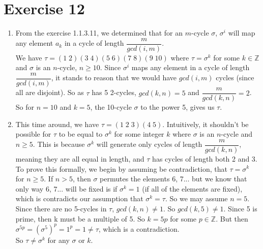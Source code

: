 \documentclass{article}
\newcommand{\Z}{\mathbb{Z}}
\begin{document}
    \section*{Exercise 12}
    \begin{enumerate}[label=\textbf{\alph*.}]
        \item 
            From the exercise 1.1.3.11, we determined that for an
            $m$-cycle $\sigma$, $\sigma^i$ will map any element $a_k$ 
            in a cycle of length $\dfrac{m}{gcd(i, m)}$. \\
            We have $\tau = (1\;2)(3\;4)(5\;6)(7\;8)(9\;10)$
            where $\tau = \sigma^k$ for some $k \in \Z$
            and $\sigma$ is an $n$-cycle, $n \geqslant 10$.
            Since $\sigma^i$ maps any element in a cycle of length
            $\dfrac{m}{gcd(i, m)}$,
            it stands to reason that we would have $gcd(i, m)$ cycles
            (since all are disjoint).
            So as $\tau$ has 5 2-cycles, $gcd(k, n) = 5$
            and $\dfrac{m}{gcd(k, n)} = 2$. So for $n = 10$ and $k = 5$,
            the 10-cycle $\sigma$ to the power 5, gives us $\tau$.
        \item
            This time around, we have $\tau = (1\;2\;3)(4\;5)$.
            Intuitively, it shouldn't be possible for $\tau$ to be
            equal to $\sigma^k$ for some integer $k$
            where $\sigma$ is an $n$-cycle and $n \geqslant 5$.
            This is because $\sigma^k$
            will generate only cycles of length $\dfrac{m}{gcd(k, n)}$,
            meaning they are all equal in length,
            and $\tau$ has cycles of length both 2 and 3.
            To prove this formally, 
            we begin by assuming be contradiction, that $\tau = \sigma^k$
            for $n \geqslant 5$.
            If $n > 5$, then $\sigma$ permutes the elements 6, 7...
            but we know that only way 6, 7... will be fixed is
            if $\sigma^k = 1$ (if all of the elements are fixed),
            which is contradicts our assumption that $\sigma^k = \tau$.
            So we may assume $n = 5$.
            Since there are no 5-cycles in $\tau$,
            $gcd(k, n) \neq 1$. So $gcd(k, 5) \neq 1$.
            Since 5 is prime, then k must be a multiple of 5.
            So $k = 5p$ for some $p \in \Z$.
            But then $\sigma^{5p} = (\sigma^5)^p = 1^p = 1 \neq \tau$,
            which is a contradiction. \\
            So $\tau \neq \sigma^k$ for any $\sigma$ or $k$.
    \end{enumerate}
\end{document}
